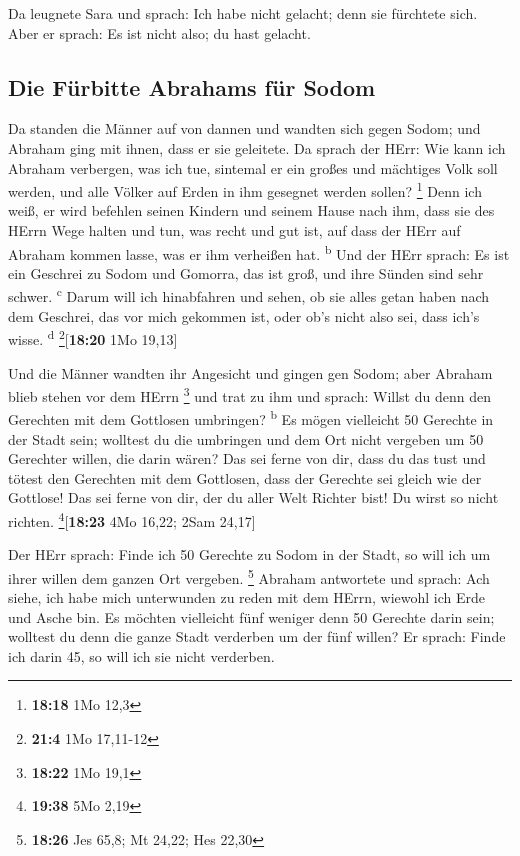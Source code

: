  Da leugnete Sara und sprach: Ich habe nicht gelacht;
denn sie fürchtete sich. Aber er sprach: Es ist nicht also; du hast
gelacht.

\hypertarget{die-fuxfcrbitte-abrahams-fuxfcr-sodom}{%
\subsection{Die Fürbitte Abrahams für
Sodom}\label{die-fuxfcrbitte-abrahams-fuxfcr-sodom}}

 Da standen die Männer auf von dannen und wandten sich
gegen Sodom; und Abraham ging mit ihnen, dass er sie geleitete.
 Da sprach der HErr: Wie kann ich Abraham verbergen, was
ich tue,  sintemal er ein großes und mächtiges Volk soll
werden, und alle Völker auf Erden in ihm gesegnet werden sollen?
\footnote{\textbf{18:18} 1Mo 12,3}  Denn ich weiß, er
wird befehlen seinen Kindern und seinem Hause nach ihm, dass sie des
HErrn Wege halten und tun, was recht und gut ist, auf dass der HErr auf
Abraham kommen lasse, was er ihm verheißen hat. \textsuperscript{b}
 Und der HErr sprach: Es ist ein Geschrei zu Sodom und
Gomorra, das ist groß, und ihre Sünden sind sehr schwer.
\textsuperscript{c}  Darum will ich hinabfahren und
sehen, ob sie alles getan haben nach dem Geschrei, das vor mich gekommen
ist, oder ob's nicht also sei, dass ich's wisse. \textsuperscript{d}
\footnote{\textbf{21:4} 1Mo 17,11-12}{[}\textbf{18:20} 1Mo 19,13{]}

 Und die Männer wandten ihr Angesicht und gingen gen
Sodom; aber Abraham blieb stehen vor dem HErrn \footnote{\textbf{18:22}
  1Mo 19,1}  und trat zu ihm und sprach: Willst du denn
den Gerechten mit dem Gottlosen umbringen? \textsuperscript{b}
 Es mögen vielleicht 50 Gerechte in der Stadt sein;
wolltest du die umbringen und dem Ort nicht vergeben um 50 Gerechter
willen, die darin wären?  Das sei ferne von dir, dass du
das tust und tötest den Gerechten mit dem Gottlosen, dass der Gerechte
sei gleich wie der Gottlose! Das sei ferne von dir, der du aller Welt
Richter bist! Du wirst so nicht richten. \footnote{\textbf{19:38} 5Mo
  2,19}{[}\textbf{18:23} 4Mo 16,22; 2Sam 24,17{]}

 Der HErr sprach: Finde ich 50 Gerechte zu Sodom in der
Stadt, so will ich um ihrer willen dem ganzen Ort vergeben. \footnote{\textbf{18:26}
  Jes 65,8; Mt 24,22; Hes 22,30}  Abraham antwortete und
sprach: Ach siehe, ich habe mich unterwunden zu reden mit dem HErrn,
wiewohl ich Erde und Asche bin.  Es möchten vielleicht
fünf weniger denn 50 Gerechte darin sein; wolltest du denn die ganze
Stadt verderben um der fünf willen? Er sprach: Finde ich darin 45, so
will ich sie nicht verderben.

